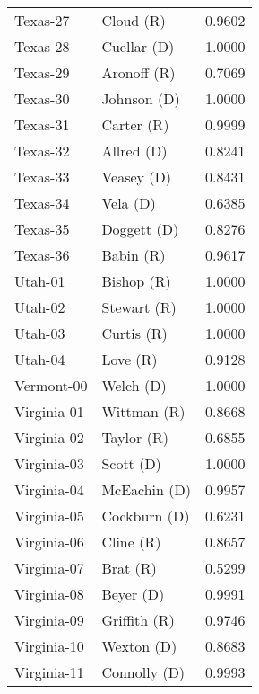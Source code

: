 \begin{longtable}{llr}
          Texas-27 &            Cloud (R) &       0.9602 \\
          Texas-28 &          Cuellar (D) &       1.0000 \\
          Texas-29 &          Aronoff (R) &       0.7069 \\
          Texas-30 &          Johnson (D) &       1.0000 \\
          Texas-31 &           Carter (R) &       0.9999 \\
          Texas-32 &           Allred (D) &       0.8241 \\
          Texas-33 &           Veasey (D) &       0.8431 \\
          Texas-34 &             Vela (D) &       0.6385 \\
          Texas-35 &          Doggett (D) &       0.8276 \\
          Texas-36 &            Babin (R) &       0.9617 \\
           Utah-01 &           Bishop (R) &       1.0000 \\
           Utah-02 &          Stewart (R) &       1.0000 \\
           Utah-03 &           Curtis (R) &       1.0000 \\
           Utah-04 &             Love (R) &       0.9128 \\
        Vermont-00 &            Welch (D) &       1.0000 \\
       Virginia-01 &          Wittman (R) &       0.8668 \\
       Virginia-02 &           Taylor (R) &       0.6855 \\
       Virginia-03 &            Scott (D) &       1.0000 \\
       Virginia-04 &         McEachin (D) &       0.9957 \\
       Virginia-05 &         Cockburn (D) &       0.6231 \\
       Virginia-06 &            Cline (R) &       0.8657 \\
       Virginia-07 &             Brat (R) &       0.5299 \\
       Virginia-08 &            Beyer (D) &       0.9991 \\
       Virginia-09 &         Griffith (R) &       0.9746 \\
       Virginia-10 &           Wexton (D) &       0.8683 \\
       Virginia-11 &         Connolly (D) &       0.9993 \\

\end{longtable}
